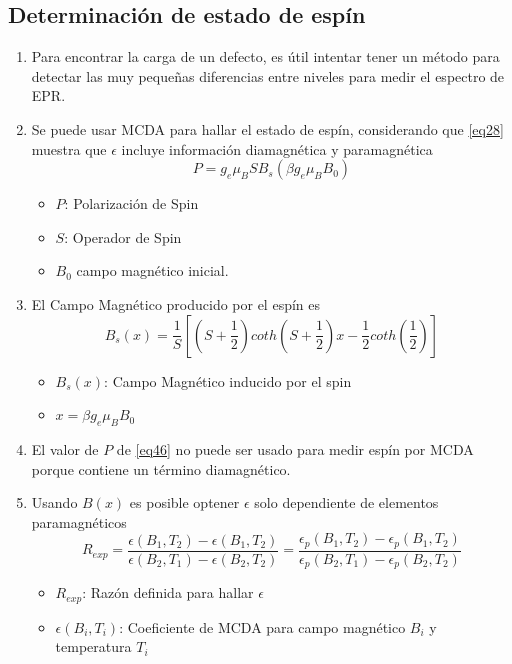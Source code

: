 \documentclass[aps,rmp,reprint,longbibliography]{revtex4-1}
\begin{document}
\subsection{Determinación de estado de espín}
\begin{enumerate}
\item Para encontrar la carga de un defecto, es útil intentar tener un método para detectar las muy pequeñas diferencias entre niveles para medir el espectro de EPR.
\item Se puede usar MCDA para hallar el estado de espín, considerando que \ref{eq28} muestra que $\epsilon$ incluye información diamagnética y paramagnética
\begin{equation}\label{eq46}P=g_e\mu_B S B_s(\beta g_e\mu_B B_0)\end{equation}
\begin{itemize}
    \item $P$: Polarización de Spin
    \item $S$: Operador de Spin
    \item $B_0$ campo magnético inicial.
\end{itemize}
\item El Campo Magnético producido por el espín es
\begin{equation}\label{eq47}B_s(x)=\frac{1}{S}[(S+\frac{1}{2})coth(S+\frac{1}{2})x-\frac{1}{2}coth(\frac{1}{2})]\end{equation}
\begin{itemize}
\item $B_s(x)$: Campo Magnético inducido por el spin
\item $x=\beta g_e\mu_B B_0$
\end{itemize}
\item El valor de $P$ de \ref{eq46} no puede ser usado para medir espín por MCDA porque contiene un término diamagnético. 
\item Usando $B(x)$ es posible optener $\epsilon$ solo dependiente de elementos paramagnéticos
\begin{equation}\label{eq48}R_{exp}=\frac{\epsilon(B_1,T_2)-\epsilon(B_1,T_2)}{\epsilon(B_2,T_1)-\epsilon(B_2,T_2)}=\frac{\epsilon_p(B_1,T_2)-\epsilon_p(B_1,T_2)}{\epsilon_p(B_2,T_1)-\epsilon_p(B_2,T_2)}\end{equation}
\begin{itemize}
    \item $R_{exp}$: Razón definida para hallar $\epsilon$
    \item $\epsilon(B_i,T_i)$: Coeficiente de MCDA para campo magnético $B_i$ y temperatura $T_i$

\end{itemize}
\end{enumerate}
\end{document}
